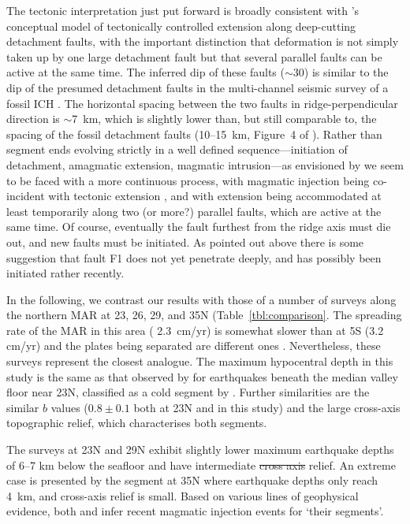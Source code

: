\documentclass[jgr]{agu2001}
\newlength{\tw}
\providecommand{\DIFadd}[1]{{\protect\color{blue}\uwave{#1}}} %
\providecommand{\DIFdel}[1]{{\protect\color{red}\sout{#1}}}                      %
\providecommand{\DIFaddbegin}{} %
\providecommand{\DIFaddend}{} %
\providecommand{\DIFdelbegin}{} %
\providecommand{\DIFdelend}{} %
\begin{document}
\begin{article}
The tectonic interpretation just put forward is broadly consistent
with \citeauthor{tucholke94}'s conceptual
model of tectonically controlled extension along deep-cutting
detachment faults, with the important distinction that deformation is
not simply taken up by one large detachment fault but that several
parallel faults can be active at the same time.  The inferred dip of
these faults ($\sim$30\dg) is similar to the dip of the presumed
detachment faults in the multi-channel seismic survey of a fossil ICH
\citep{ranero99}.  The horizontal spacing between the two faults in
ridge-perpendicular direction is $\sim$7~km, which is slightly lower
than, but still comparable to, the spacing of the fossil detachment
faults (10--15~km, Figure~4 of \citet{ranero99}).  Rather than segment
ends evolving strictly in a well defined sequence---initiation of
detachment, amagmatic extension, magmatic intrusion---as envisioned by
\citet{tucholke94} we seem to be faced with a more continuous process,
with magmatic injection being co-incident with tectonic extension
\citep{reston02}, and with extension being accommodated at least
temporarily along two (or more?) parallel faults, which are
active at the same time.  
Of course, eventually the fault furthest
from the ridge axis must die out, and new faults must be
initiated. As pointed out above there is some suggestion that fault
F1 does not yet penetrate deeply, and has possibly been initiated
rather recently.

In the following, we contrast our results with those of a number of
surveys along the northern MAR at 23\dg, 26\dg, 29\dg,  and 35\dg N (Table~\ref{tbl:comparison}.  The spreading
rate of the MAR in this area ( 2.3~cm/yr) is somewhat slower than
at 5\dg S (3.2 cm/yr) and the plates being separated are different
ones \citep{demets94}.
Nevertheless, these surveys represent the closest analogue.
The maximum hypocentral depth in this study is the same as that
observed by \citet{toomey88} for earthquakes beneath the median valley
floor near 23\dg N, classified as a cold segment by \citep{thibaud98}. Further similarities are the
similar $b$ values ($0.8\pm0.1$ both at 23\dg N and in this
study) and the large cross-axis topographic relief, which
characterises both segments.

The surveys at 23\dg N \citep{kong92} and 29\dg N \citep{wolfe95}
exhibit slightly lower maximum earthquake depths of 6--7 km below the
seafloor and have intermediate \DIFdelbegin \DIFdel{cross axis }\DIFdelend \DIFaddbegin \DIFadd{cross-axis }\DIFaddend relief.  An extreme case is
presented by the segment at 35\dg N \citep{barclay01} where earthquake
depths only reach 4~km, and cross-axis relief is small.  Based on
various lines of geophysical evidence, both
\citet{kong92} and \citet{barclay01} infer recent magmatic injection
events for `their segments'.


\end{article}
\end{document}
